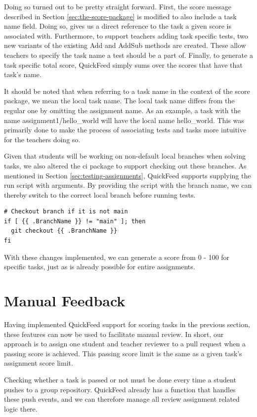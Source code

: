 Doing so turned out to be pretty straight forward.
First, the score message described in Section \ref{sec:the-score-package} is modified to also include a task name field.
Doing so, gives us a direct reference to the task a given score is associated with.
Furthermore, to support teachers adding task specific tests, two new variants of the existing Add and AddSub methods are created.
These allow teachers to specify the task name a test should be a part of.
Finally, to generate a task specific total score, QuickFeed simply sums over the scores that have that task's name.

It should be noted that when referring to a task name in the context of the score package, we mean the local task name.
The local task name differs from the regular one by omitting the assignment name.
As an example, a task with the name assignment1/hello\_world will have the local name hello\_world.
This was primarily done to make the process of associating tests and tasks more intuitive for the teachers doing so.

Given that students will be working on non-default local branches when solving tasks, we also altered the ci package to support checking out these branches.
As mentioned in Section \ref{sec:testing-assignments}, QuickFeed supports supplying the run script with arguments.
By providing the script with the branch name, we can thereby switch to the correct local branch before running tests.
\begin{lstlisting}[caption={Checking out non-default local branch}, numbers=none]
# Checkout branch if it is not main
if [ {{ .BranchName }} != "main" ]; then
  git checkout {{ .BranchName }}
fi
\end{lstlisting}

With these changes implemented, we can generate a score from 0 - 100 for specific tasks, just as is already possible for entire assignments.

\section{Manual Feedback}

Having implemented QuickFeed support for scoring tasks in the previous section, these features can now be used to facilitate manual review.
In short, our approach is to assign one student and teacher reviewer to a pull request when a passing score is achieved.
This passing score limit is the same as a given task's assignment score limit.

Checking whether a task is passed or not must be done every time a student pushes to a group repository.
QuickFeed already has a function that handles these push events, and we can therefore manage all review assignment related logic there.

